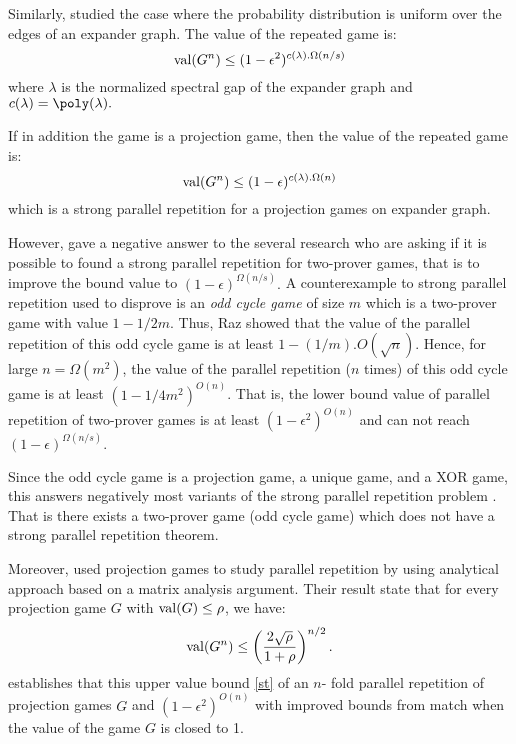 Similarly, \cite{raz2012strong} studied the case where the probability distribution is uniform over the edges of an expander graph. The value of the repeated game is:
$$\mathrm{val} (G^n) \leq (1-\epsilon^2)^{c(\lambda). \Omega(n/s)}$$ where $\lambda$ is the normalized spectral gap of the expander  graph and $c(\lambda)=\poly (\lambda).$ 

If in addition the game is a projection game, then the value of the repeated game is: $$\mathrm{val} (G^n) \leq (1-\epsilon)^{c(\lambda). \Omega(n)}$$ which is  a strong parallel repetition for a projection games on expander graph.

However, \cite{raz2011counterexample} gave a negative answer to the several research who are asking if it is possible to found a strong parallel repetition for two-prover games, that is to improve the bound value to  $(1-\epsilon)^{\Omega(n/s)}.$ A counterexample to strong parallel repetition used to disprove is an \textit{odd cycle game} of size $m$ which is a two-prover game with value $1-1/2m.$ Thus, Raz showed that
the value of the parallel repetition of this odd cycle game is at least $1-(1/m).O(\sqrt{n})$. Hence, for large $n = \Omega(m^2)$, the value of  the parallel repetition ($n$ times) of this odd cycle game is at least $(1-1/4m^2)^{O(n)}$.
That is, the lower bound value of parallel repetition of two-prover games is at least $(1-\epsilon^2)^{O(n)}$ and can not reach $(1-\epsilon)^{\Omega(n/s)}.$

Since the odd cycle game is a projection game, a unique game, and a XOR game, this answers negatively most
variants of the strong parallel repetition problem \citep{raz2011counterexample, raz2012strong}. That is there exists a two-prover game (odd cycle game) which does not have a strong parallel repetition theorem. 

Moreover, \cite{dinur2014analytical} used projection games to study parallel repetition by using analytical approach based on a matrix analysis argument. Their
result state that for every projection game $G$ with $\mathrm{val} (G) \leq \rho$, we have:  \begin{align}
\mathrm{val} (G^n) \leq \left(\frac{2\sqrt{\rho}}{1+\rho} \right)^{n/2}. \label{st}
\end{align}
\cite{dinur2014analytical} establishes that this upper value  bound \eqref{st} of an $n$- fold parallel repetition of projection games $G$ and  $(1-\epsilon^2)^{O(n)}$  
with improved bounds from  \cite{rao2011parallel} match when the value of the game $G$ is closed to 1.

